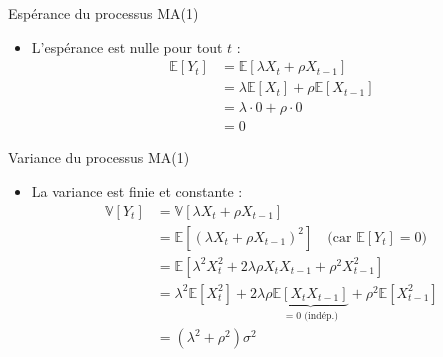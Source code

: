 \documentclass[11pt,aspectratio=169]{beamer}
\newcommand{\E}{\mathbb{E}}
\newcommand{\Var}{\mathbb{V}}
\begin{document}
\begin{frame}{Espérance du processus MA(1)}

\begin{itemize}

\item L'espérance est nulle pour tout $t$ :
  \begin{align*}
  \E[Y_t] &= \E[\lambda X_t + \rho X_{t-1}] \\
  &= \lambda \E[X_t] + \rho \E[X_{t-1}] \\
  &= \lambda \cdot 0 + \rho \cdot 0 \\
  &= 0
  \end{align*}

\end{itemize}

\end{frame}

\begin{frame}{Variance du processus MA(1)}

\begin{itemize}

\item La variance est finie et constante :
  \begin{align*}
  \Var[Y_t] &= \Var[\lambda X_t + \rho X_{t-1}] \\
  &= \E\left[(\lambda X_t + \rho X_{t-1})^2\right] \quad \text{(car } \E[Y_t] = 0\text{)} \\
  &= \E\left[\lambda^2 X_t^2 + 2\lambda\rho X_t X_{t-1} + \rho^2 X_{t-1}^2\right] \\
  &= \lambda^2 \E[X_t^2] + 2\lambda\rho \underbrace{\E[X_t X_{t-1}]}_{= 0 \text{ (indép.)}} + \rho^2 \E[X_{t-1}^2] \\
  &= (\lambda^2 + \rho^2) \sigma^2
  \end{align*}

\end{itemize}

\end{frame}
\end{document}
